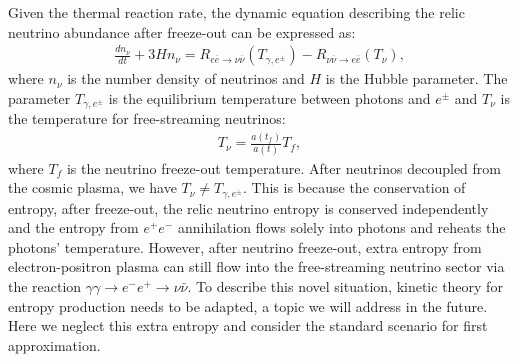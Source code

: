 Given the thermal reaction rate, the dynamic equation describing the relic neutrino abundance after freeze-out can be expressed as:
\begin{align}\label{ExtraNeutrioEq}
\frac{dn_\nu}{dt}+3Hn_\nu=R_{e\overline{e}\to\nu\overline{\nu}}(T_{\gamma,e^\pm})-R_{\nu\overline{\nu}\to e\overline{e}}(T_\nu),
\end{align}
where $n_\nu$ is the number density of neutrinos and $H$ is the Hubble parameter. The parameter $T_{\gamma,e^\pm}$ is the equilibrium temperature between photons and $e^\pm$ and $T_\nu$ is the temperature for free-streaming neutrinos: 
\begin{align}
T_\nu=\frac{a(t_f)}{a(t)}T_f,
\end{align}
where $T_f$ is the neutrino freeze-out temperature. After neutrinos decoupled from the cosmic plasma, we have $T_\nu\neq T_{\gamma,e^\pm}$. This is because
the conservation of entropy, after freeze-out, the relic neutrino entropy is conserved independently and the entropy from $e^+e^-$ annihilation flows solely into photons and reheats the photons' temperature. However, after neutrino freeze-out, extra entropy from electron-positron plasma can still flow into the free-streaming neutrino sector via the reaction $\gamma\gamma\to e^-e^+\to\nu\bar{\nu}$. To describe this novel situation, kinetic theory for entropy production needs to be adapted, a topic we will address in the future. Here we neglect this extra entropy and consider the standard scenario for first approximation.


